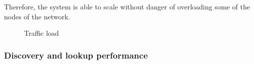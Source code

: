 Therefore, the system is able to scale without danger of overloading some of the nodes of the network.

\begin{figure}[!h]
\centering
{} 
\hspace{-0.25cm}
 \caption{Traffic load} 
\label{fig:traffic}
\vspace{-0.15in}
\end{figure}   

\subsubsection{Discovery and lookup performance}


